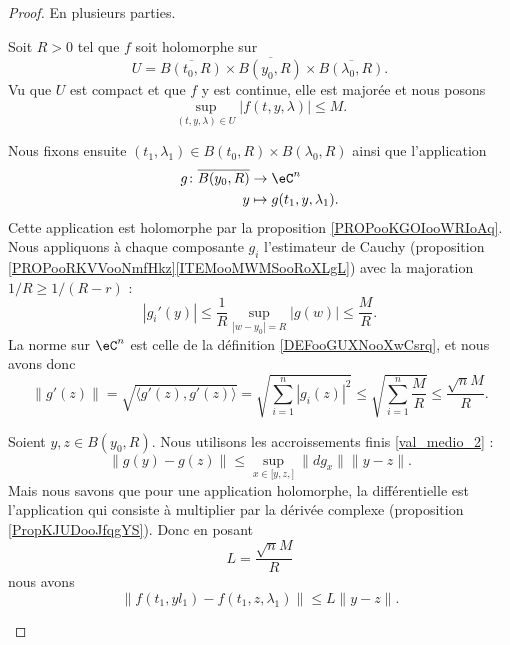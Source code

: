 \begin{proof}
	En plusieurs parties.
	\begin{subproof}
		\spitem[Sécurité]

		Soit \( R>0\) tel que \( f\) soit holomorphe sur
		\begin{equation}
			U=\overline{B(t_0,R)}\times \overline{B(y_0,R)}\times \overline{B(\lambda_0,R)}.
		\end{equation}
		Vu que \( U\) est compact et que \( f\) y est continue, elle est majorée et nous posons
		\begin{equation}
			\sup_{(t,y,\lambda)\in U}| f(t,y,\lambda) |\leq M.
		\end{equation}


		Nous fixons ensuite \( (t_1,\lambda_1)\in B(t_0,R)\times B(\lambda_0,R)\) ainsi que l'application
		\begin{equation}
			\begin{aligned}
				g\colon \overline{B(y_0,R)} & \to \eC^n                   \\
				y                           & \mapsto g(t_1,y,\lambda_1).
			\end{aligned}
		\end{equation}
		Cette application est holomorphe par la proposition \ref{PROPooKGOIooWRIoAq}. Nous appliquons à chaque composante \( g_i\) l'estimateur de Cauchy (proposition \ref{PROPooRKVVooNmfHkz}\ref{ITEMooMWMSooRoXLgL}) avec la majoration \( 1/R\geq 1/(R-r)\) :
		\begin{equation}
			| g_i'(y) |\leq \frac{1}{ R}\sup_{| w-y_0 |=R}| g(w) |\leq \frac{ M }{ R }.
		\end{equation}
		La norme sur \( \eC^n\) est celle de la définition \ref{DEFooGUXNooXwCsrq}, et nous avons donc
		\begin{equation}
			\| g'(z) \|  =\sqrt{ \langle g'(z), g'(z) \rangle }
			=\sqrt{ \sum_{i=1}^n| g_i(z) |^2 }
			\leq\sqrt{\sum_{i=1}^n\frac{ M }{ R }}
			\leq \frac{ \sqrt{n}M }{ R }.
		\end{equation}

		Soient \( y,z\in B(y_0,R)\). Nous utilisons les accroissements finis \ref{val_medio_2} :
		\begin{equation}
			\| g(y)-g(z) \|\leq \sup_{x\in \mathopen[ y,z,\mathclose]}\| dg_x \|\| y-z \|.
		\end{equation}
		Mais nous savons que pour une application holomorphe, la différentielle est l'application qui consiste à multiplier par la dérivée complexe (proposition \ref{PropKJUDooJfqgYS}). Donc en posant
		\begin{equation}
			L=\frac{ \sqrt{n}M }{ R }
		\end{equation}
		nous avons
		\begin{equation}
			\| f(t_1,yl_1)-f(t_1,z,\lambda_1) \|\leq L\| y-z \|.
		\end{equation}


\end{subproof}
\end{proof}

